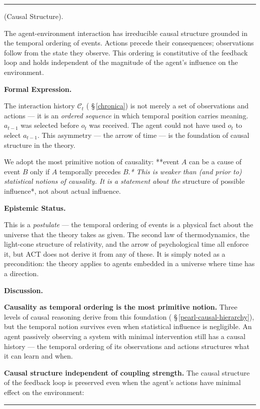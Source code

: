 \documentclass[11pt,oneside]{article}
\newcounter{claim}[section]
\renewcommand{\theclaim}{\thesection.\arabic{claim}}
\newenvironment{segment}[2]{%
  \refstepcounter{claim}%
  \bigskip\noindent\hrule\smallskip
  \noindent{\bfseries #1~\theclaim}\enskip(#2).\par\smallskip
  \noindent\ignorespaces
}{%
  \par\smallskip\noindent\hrule\bigskip
}
\newenvironment{postulate}[1][]{\begin{segment}{Postulate}{#1}}{\end{segment}}
\begin{document}
\begin{postulate}[Causal Structure]
\label{causal-structure}
The agent-environment interaction has irreducible causal structure grounded in the temporal ordering of events. Actions precede their consequences; observations follow from the state they observe. This ordering is constitutive of the feedback loop and holds independent of the magnitude of the agent's influence on the environment.



\medskip\noindent\textbf{Formal Expression.}



The interaction history $\mathcal C_t$ ( \S\,\ref{chronica}) is not merely a set of observations and actions — it is an \textit{ordered sequence} in which temporal position carries meaning. $a_{t-1}$ was selected before $o_t$ was received. The agent could not have used $o_t$ to select $a_{t-1}$. This asymmetry — the arrow of time — is the foundation of causal structure in the theory.

We adopt the most primitive notion of causality: **event $A$ can be a cause of event $B$ only if $A$ temporally precedes $B$.\textit{* This is weaker than (and prior to) statistical notions of causality. It is a statement about the }structure of possible influence*, not about actual influence.


\medskip\noindent\textbf{Epistemic Status.}


This is a \textit{postulate} — the temporal ordering of events is a physical fact about the universe that the theory takes as given. The second law of thermodynamics, the light-cone structure of relativity, and the arrow of psychological time all enforce it, but ACT does not derive it from any of these. It is simply noted as a precondition: the theory applies to agents embedded in a universe where time has a direction.


\medskip\noindent\textbf{Discussion.}


\textbf{Causality as temporal ordering is the most primitive notion.} Three levels of causal reasoning derive from this foundation ( \S\,\ref{pearl-causal-hierarchy}), but the temporal notion survives even when statistical influence is negligible. An agent passively observing a system with minimal intervention still has a causal history — the temporal ordering of its observations and actions structures what it can learn and when.

\textbf{Causal structure independent of coupling strength.} The causal structure of the feedback loop is preserved even when the agent's actions have minimal effect on the environment:


\end{postulate}
\end{document}
